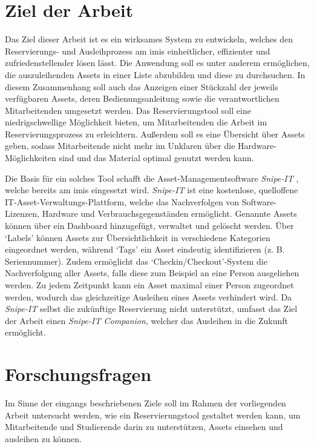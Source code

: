 \section{Ziel der Arbeit}
Das Ziel dieser Arbeit ist es ein wirksames System zu entwickeln, welches den
Reservierungs- und Ausleihprozess am \ac{imis} einheitlicher, effizienter und
zufriedenstellender lösen lässt. Die Anwendung soll es unter anderem
ermöglichen, die auszuleihenden Assets in einer Liste abzubilden und diese zu
durchsuchen. In diesem Zusammenhang soll auch das Anzeigen einer Stückzahl der
jeweils verfügbaren Assets, deren Bedienungsanleitung sowie die verantwortlichen
Mitarbeitenden umgesetzt werden. Das Reservierungstool soll eine
niedrigschwellige Möglichkeit bieten, um Mitarbeitenden die Arbeit im
Reservierungsprozess zu erleichtern. Außerdem soll es eine Übersicht über Assets
geben, sodass Mitarbeitende nicht mehr im Unklaren über die
Hardware-Möglichkeiten sind und das Material optimal genutzt werden kann.

Die Basis für ein solches Tool schafft die Asset-Managementsoftware
\textit{Snipe-IT} \cite{noauthor_home_nodate}, welche bereits am \ac{imis}
eingesetzt wird. \textit{Snipe-IT} ist eine kostenlose, quelloffene
IT-Asset-Verwaltungs-Plattform, welche das Nachverfolgen von Software-Lizenzen,
Hardware und Verbrauchsgegenständen ermöglicht. Genannte Assets können über ein
Dashboard hinzugefügt, verwaltet und gelöscht werden. Über \enquote*{Labels}
können Assets zur Übersichtlichkeit in verschiedene Kategorien eingeordnet
werden, während \enquote*{Tags} ein Asset eindeutig identifizieren (z. B. Seriennummer).
Zudem ermöglicht das \enquote*{Checkin/Checkout}-System die Nachverfolgung aller Assets,
falls diese zum Beispiel an eine Person ausgeliehen werden. Zu jedem Zeitpunkt
kann ein Asset maximal einer Person zugeordnet werden, wodurch das
gleichzeitige Ausleihen eines Assets verhindert wird. Da \textit{Snipe-IT}
selbst die zukünftige Reservierung nicht unterstützt, umfasst das Ziel der
Arbeit einen \textit{Snipe-IT Companion}, welcher das Ausleihen in die Zukunft
ermöglicht.


\section{Forschungsfragen}
\label{sec:Forschungsfragen}
Im Sinne der eingangs beschriebenen Ziele soll im Rahmen der vorliegenden Arbeit
untersucht werden, wie ein Reservierungstool gestaltet werden kann, um
Mitarbeitende und Studierende darin zu unterstützen, Assets einsehen und
ausleihen zu können.

